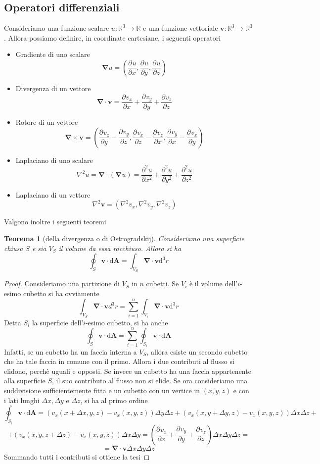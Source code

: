 \documentclass[a4paper,11pt]{book}
\newcommand{\dif}{\mathrm{d}}
\newcommand{\der}[3][]{\frac{\partial ^{#1}#2}{\partial {#3}^{#1}}}
\newcommand{\R}{\mathbb{R}}
\let\oldnabla\nabla
\renewcommand{\nabla}{\vec{\oldnabla}}
\newcommand{\lap}{\oldnabla^2}
\renewcommand{\vec}[1]{\mathbf{#1}}
\theoremstyle{theorem}
\newtheorem{teorema}{Teorema}[section]
\theoremstyle{definition}
\begin{document}
\subsection{Operatori differenziali}
Consideriamo una funzione scalare $u\colon\R^3\to\R$ e una funzione vettoriale $\vec{v}\colon\R^3\to\R^3$. Allora possiamo definire, in coordinate cartesiane, i seguenti operatori
\begin{itemize}
	\item Gradiente di uno scalare
	\[\nabla u=\left(\der{u}{x},\der{u}{y},\der{u}{z}\right)\]
	\item Divergenza di un vettore
	\[\nabla\cdot\vec{v}=\der{v_x}{x}+\der{v_y}{y}+\der{v_z}{z}\]
	\item Rotore di un vettore
	\[\nabla\times\vec{v}=\left(\der{v_z}{y}-\der{v_y}{z},\der{v_x}{z}-\der{v_z}{x},\der{v_y}{x}-\der{v_x}{y}\right)\]
	\item Laplaciano di uno scalare
	\[\lap u=\nabla\cdot\left(\nabla u\right)=\der[2]{u}{x}+\der[2]{u}{y}+\der[2]{u}{z}\]
	\item Laplaciano di un vettore
	\[\lap\vec{v}=\left(\lap v_x,\lap v_y,\lap v_z\right)\]
\end{itemize}
Valgono inoltre i seguenti teoremi
\begin{teorema}[della divergenza o di Ostrogradskij] Consideriamo una superficie chiusa $S$ e sia $V_S$ il volume da essa racchiuso. Allora si ha
	\[\oint_S\vec{v}\cdot\dif\vec{A}=\int_{V_S}\nabla\cdot\vec{v}\dif^3r\]
\end{teorema}
\begin{proof}
	Consideriamo una partizione di $V_S$ in $n$ cubetti. Se $V_i$ è il volume dell'$i$-esimo cubetto si ha ovviamente
	\[\int_{V_S}\nabla\cdot\vec{v}d^3r=\sum_{i=1}^{n}\int_{V_i}\nabla\cdot\vec{v}\dif^3r\]
	Detta $S_i$ la superficie dell'$i$-esimo cubetto, si ha anche
	\[\oint_S\vec{v}\cdot\dif\vec{A}=\sum_{i=1}^{n}\oint_{S_i}\vec{v}\cdot\dif\vec{A}\]
	Infatti, se un cubetto ha un faccia interna a $V_S$, allora esiste un secondo cubetto che ha tale faccia in comune con il primo. Allora i due contributi al flusso si elidono, perchè uguali e opposti. Se invece un cubetto ha una faccia appartenente alla superficie $S$, il suo contributo al flusso non si elide. Se ora consideriamo una suddivisione sufficientemente fitta e un cubetto con un vertice in $(x,y,z)$ e con i lati lunghi $\Delta x,\Delta y$ e $\Delta z$, si ha al primo ordine
	\[\oint_{S_i}\vec{v}\cdot\dif\vec{A}=\left(v_x(x+\Delta x,y,z)-v_x(x,y,z)\right)\Delta y\Delta z+\left(v_x(x,y+\Delta y,z)-v_x(x,y,z)\right)\Delta x\Delta z+\]\[+\left(v_x(x,y,z+\Delta z)-v_x(x,y,z)\right)\Delta x\Delta y=\left(\der{v_x}{x}+\der{v_y}{y}+\der{v_z}{z}\right)\Delta x\Delta y\Delta z=\]\[=\nabla\cdot\vec{v}\Delta x\Delta y\Delta z\]
	Sommando tutti i contributi si ottiene la tesi
\end{proof}
\end{document}
